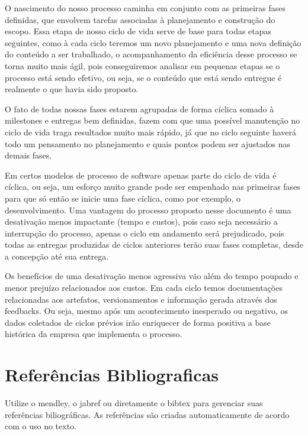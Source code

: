 \documentclass[	DIV=calc,%
							paper=a4,%
							fontsize=12pt,%
							onecolumn]{scrartcl}	 					%
\begin{document}
O nascimento do nosso processo caminha em conjunto com as primeiras fases definidas, que envolvem tarefas associadas à planejamento e construção do escopo. Essa etapa de nosso ciclo de vida serve de base para todas etapas seguintes, como à cada ciclo teremos um novo planejamento e uma nova definição do conteúdo a ser trabalhado, o acompanhamento da eficiência desse processo se torna muito mais ágil, pois conseguiremos analisar em pequenas etapas se o processo está sendo efetivo, ou seja, se o conteúdo que está sendo entregue é realmente o que havia sido proposto. 

O fato de todas nossas fases estarem agrupadas de forma cíclica somado à milestones e entregas bem definidas, fazem com que uma possível manutenção no ciclo de vida traga resultados muito mais rápido, já que no ciclo seguinte haverá todo um pensamento no planejamento e quais pontos podem ser ajustados nas demais fases. 

Em certos modelos de processo de software apenas parte do ciclo de vida é cíclica, ou seja, um esforço muito grande pode ser empenhado nas primeiras fases para que só então se inicie uma fase cíclica, como por exemplo, o desenvolvimento.  Uma vantagem do processo proposto nesse documento é uma desativação menos impactante (tempo e custos), pois caso seja necessário a interrupção do processo, apenas o ciclo em andamento será prejudicado, pois todas as entregas produzidas de ciclos anteriores terão suas fases completas, desde a concepção até sua entrega. 

Os benefícios de uma desativação menos agressiva vão além do tempo poupado e menor prejuízo relacionados aos custos. Em cada ciclo temos documentações relacionadas aos artefatos, versionamentos e informação gerada através dos feedbacks. Ou seja, mesmo após um acontecimento inesperado ou negativo, os dados coletados de ciclos prévios irão enriquecer de forma positiva a base histórica da empresa que implementa o processo. 


\clearpage
\section{Referências Bibliograficas}
\begingroup
\renewcommand{\section}[2]{}
Utilize o mendley, o jabref ou diretamente o bibtex para gerenciar suas referências biliográficas. As referências são criadas automaticamente de acordo com o uso no texto.
\end{document}
